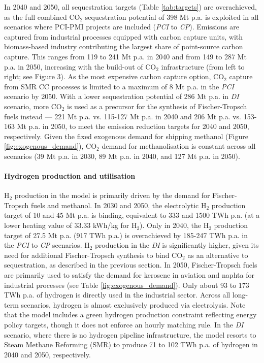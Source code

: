 \documentclass[pdflatex,sn-nature]{sn-jnl}%
\theoremstyle{thmstyleone}%
\theoremstyle{thmstyletwo}%
\theoremstyle{thmstylethree}%
\begin{document}
In 2040 and 2050, all sequestration targets (Table \ref{tab:targets}) are overachieved, as the full combined CO$_2$ sequestration potential of 398 Mt p.a. is exploited in all scenarios where PCI-PMI projects are included (\textit{PCI} to \textit{CP}).  Emissions are captured from industrial processes equipped with carbon capture units, with biomass-based industry contributing the largest share of point-source carbon capture. This ranges from 119 to 241 Mt p.a. in 2040 and from 149 to 287 Mt p.a. in 2050, increasing with the build-out of CO$_2$ infrastructure (from left to right; see Figure 3). As the most expensive carbon capture option, CO$_2$ capture from SMR CC processes is limited to a maximum of 8 Mt p.a. in the \textit{PCI} scenario by 2050.
With a lower sequestration potential of 286 Mt p.a. in \textit{DI} scenario, more CO$_2$ is used as a precursor for the synthesis of Fischer-Tropsch fuels instead --- 221 Mt p.a. vs. 115-127 Mt p.a. in 2040 and 206 Mt p.a. vs. 153-163 Mt p.a. in 2050, to meet the emission reduction targets for 2040 and 2050, respectively. 
Given the fixed exogenous demand for shipping methanol (Figure \ref{fig:exogenous_demand}), CO$_2$ demand for methanolisation is constant across all scenarios (39 Mt p.a. in 2030, 89 Mt p.a. in 2040, and 127 Mt p.a. in 2050). 

\paragraph{Hydrogen production and utilisation}\label{sec:h2_production_and_utilisation}
H$_2$ production in the model is primarily driven by the demand for Fischer-Tropsch fuels and methanol. In 2030 and 2050, the electrolytic H$_2$ production target of 10 and 45 Mt p.a. is binding, equivalent to 333 and 1500 TWh p.a. (at a lower heating value of 33.33 kWh/kg for H$_2$). Only in 2040, the H$_2$ production target of 27.5 Mt p.a. (917 TWh p.a.) is overachieved by 185-247 TWh p.a. in the \textit{PCI} to \textit{CP} scenarios. H$_2$ production in the \textit{DI} is significantly higher, given its need for additional Fischer-Tropsch synthesis to bind CO$_2$ as an alternative to sequestration, as described in the previous section.
In 2050, Fischer-Tropsch fuels are primarily used to satisfy the demand for kerosene in aviation and naphta for industrial processes (see Table \ref{fig:exogenous_demand}). Only about 93 to 173 TWh p.a. of hydrogen is directly used in the industrial sector. Across all long-term scenarios, hydrogen is almost exclusively produced via electrolysis. Note that the model includes a green hydrogen production constraint reflecting energy policy targets, though it does not enforce an hourly matching rule.
In the \textit{DI} scenario, where there is no hydrogen pipeline infrastructure, the model resorts to Steam Methane Reforming (SMR) to produce 71 to 102 TWh p.a. of hydrogen in 2040 and 2050, respectively.
\end{document}
